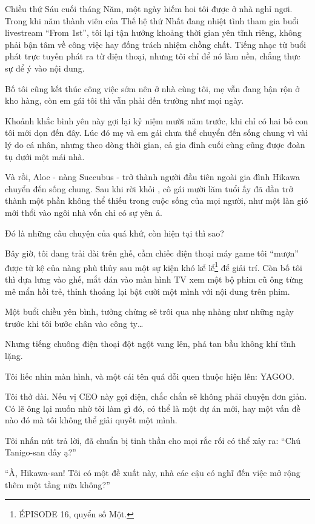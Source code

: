 \documentclass[../main.tex]{subfiles}
\begin{document}

Chiều thứ Sáu cuối tháng Năm, một ngày hiếm hoi tôi được ở nhà nghỉ ngơi. Trong khi năm thành viên của Thế hệ thứ Nhất đang nhiệt tình tham gia buổi livestream ``From 1st'', tôi lại tận hưởng khoảng thời gian yên tĩnh riêng, không phải bận tâm về công việc hay đống trách nhiệm chồng chất. Tiếng nhạc từ buổi phát trực tuyến phát ra từ điện thoại, nhưng tôi chỉ để nó làm nền, chẳng thực sự để ý vào nội dung.

Bố tôi cũng kết thúc công việc sớm nên ở nhà cùng tôi, mẹ vẫn đang bận rộn ở kho hàng, còn em gái tôi thì vẫn phải đến trường như mọi ngày.

Khoảnh khắc bình yên này gợi lại kỷ niệm mười năm trước, khi chỉ có hai bố con tôi mới dọn đến đây. Lúc đó mẹ và em gái chưa thể chuyển đến sống chung vì vài lý do cá nhân, nhưng theo dòng thời gian, cả gia đình cuối cùng cũng được đoàn tụ dưới một mái nhà.

Và rồi, Aloe - nàng Succubus - trở thành người đầu tiên ngoài gia đình Hikawa chuyển đến sống chung. Sau khi rời khỏi \hll, cô gái mười lăm tuổi ấy đã dần trở thành một phần không thể thiếu trong cuộc sống của mọi người, như một làn gió mới thổi vào ngôi nhà vốn chỉ có sự yên ả.

Đó là những câu chuyện của quá khứ, còn hiện tại thì sao?

Bây giờ, tôi đang trải dài trên ghế, cầm chiếc điện thoại máy game tôi ``mượn'' được từ kệ của nàng phù thủy sau một sự kiện khó kể lể\footnote{{\flaregothic ÉPISODE 16}, quyển số Một.} để giải trí. Còn bố tôi thì dựa lưng vào ghế, mắt dán vào màn hình TV xem một bộ phim cũ ông từng mê mẩn hồi trẻ, thỉnh thoảng lại bật cười một mình với nội dung trên phim.

Một buổi chiều yên bình, tưởng chừng sẽ trôi qua nhẹ nhàng như những ngày trước khi tôi bước chân vào công ty\dots

Nhưng tiếng chuông điện thoại đột ngột vang lên, phá tan bầu không khí tĩnh lặng.

Tôi liếc nhìn màn hình, và một cái tên quá đỗi quen thuộc hiện lên: YAGOO.

Tôi thở dài. Nếu vị CEO này gọi điện, chắc chắn sẽ không phải chuyện đơn giản. Có lẽ ông lại muốn nhờ tôi làm gì đó, có thể là một dự án mới, hay một vấn đề nào đó mà tôi không thể giải quyết một mình.

Tôi nhấn nút trả lời, đã chuẩn bị tinh thần cho mọi rắc rối có thể xảy ra: ``Chú Tanigo-san đấy ạ?''

``À, Hikawa-san! Tôi có một đề xuất này, nhà các cậu có nghĩ đến việc mở rộng thêm một tầng nữa không?''
\end{document}
